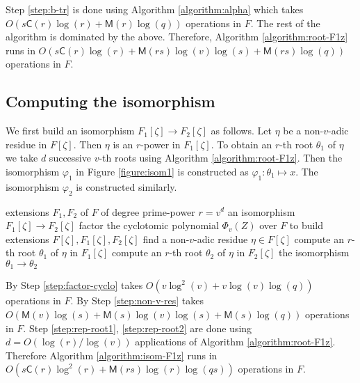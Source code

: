 \documentclass[12pt]{article}
\theoremstyle{plain}
\theoremstyle{definition}
\def\MM{\ensuremath{\mathsf{M}}}
\def\CC{\ensuremath{\mathsf{C}}}
\newcounter{algorithm}
\begin{document}
Step \ref{step:b-tr} is done using Algorithm \ref{algorithm:alpha} which takes $O(s\CC(r)\log(r) + 
\MM(r)\log(q))$ operations in $F$. The rest of the algorithm is dominated by the above. Therefore, 
Algorithm \ref{algorithm:root-F1z} runs in $O(s\CC(r)\log(r) + \MM(rs)\log(v)\log(s) + 
\MM(rs)\log(q))$ operations in $F$. 






\subsection{Computing the isomorphism}

We first build an isomorphism $F_1[\zeta] \rightarrow F_2[\zeta]$ as follows. Let $\eta$ be a 
non-$v$-adic residue in $F[\zeta]$. Then $\eta$ is an $r$-power in $F_1[\zeta]$. To obtain an 
$r$-th root $\theta_1$ of $\eta$ we take $d$ successive $v$-th roots using Algorithm 
\ref{algorithm:root-F1z}. Then the isomorphism $\varphi_1$ in Figure \ref{figure:isom1} is 
constructed as $\varphi_1: \theta_1 \mapsto x$. The isomorphism $\varphi_2$ is constructed 
similarly.

\begin{algorithm}
	\label{algorithm:isom-F1z}
	\begin{algorithmic}[1]
		\REQUIRE extensions $F_1, F_2$ of $F$ of degree prime-power $r = v^d$
		\ENSURE an isomorphism $F_1[\zeta] \rightarrow F_2[\zeta]$
		\STATE\label{step:factor-cyclo} factor the cyclotomic polynomial $\Phi_v(Z)$ over $F$ to 
		build extensions $F[\zeta],	F_1[\zeta], F_2[\zeta]$
		\STATE\label{step:non-v-res} find a non-$v$-adic residue $\eta \in F[\zeta]$
		\STATE\label{step:rep-root1} compute an $r$-th root $\theta_1$ of $\eta$ in $F_1[\zeta]$
		\STATE\label{step:rep-root2} compute an $r$-th root $\theta_2$ of $\eta$ in $F_2[\zeta]$
		\RETURN the isomorphism $\theta_1 \rightarrow \theta_2$
	\end{algorithmic}
\end{algorithm}

By \cite[Theorem 9]{shoup94} Step \ref{step:factor-cyclo} takes $O(v\log^2(v) + v\log(v)\log(q))$ 
operations in $F$. By \cite[Lemma 15]{shoup94} Step \ref{step:non-v-res} takes $O(\MM(v)\log(s) + 
\MM(s)\log(v)\log(s) + \MM(s)\log(q))$ operations in $F$. Step \ref{step:rep-root1}, 
\ref{step:rep-root2} are done using $d = O(\log(r) / \log(v))$ applications of Algorithm 
\ref{algorithm:root-F1z}. Therefore Algorithm \ref{algorithm:isom-F1z} runs in $O(s\CC(r)\log^2(r) 
+ \MM(rs)\log(r)\log(qs))$ operations in $F$. 
\end{document}
